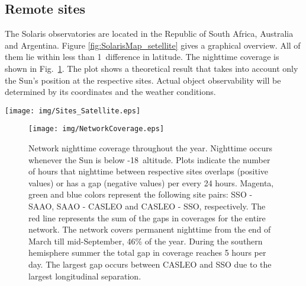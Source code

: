 \subsection{Remote sites}
\label{ssec:RemoteSites}
The Solaris observatories are located in the Republic of South Africa, Australia and Argentina. Figure \ref{fig:SolarisMap_setellite} gives a graphical overview. All of them lie within less than 1\degree\ difference in latitude. The nighttime coverage is shown in Fig.~\ref{fig:NetworkCoverage}. The plot shows a theoretical result that takes into account only the Sun's position at the respective sites. Actual object observability will be determined by its coordinates and the weather conditions.


\begin{figure*}[htb!]
\begin{center}
\texttt{[image: img/Sites\_Satellite.eps]}
\caption{Birdseye views of the three observatories with exact Solaris sites marked along with several important waypoints at the South African Astronomical Observatory (SAAO, South Africa), Siding Spring Observatory (SSO, Australia) and Complejo Astron\'omico El Leoncito (CALSEO, Argentina). North is up on all images.  Background image source google.com.}
\label{fig:SolarisMap_setellite}
\end{center}
\end{figure*}

\begin{figure}[htb!]
\begin{center}
\texttt{[image: img/NetworkCoverage.eps]}
\caption{Network nighttime coverage throughout the year. Nighttime occurs whenever the Sun is below -18\degree ~altitude.  Plots indicate the number of hours that nighttime between respective sites overlaps (positive values) or has a gap (negative values) per every 24 hours. Magenta, green and blue colors represent the following site pairs: SSO - SAAO, SAAO - CASLEO and CASLEO - SSO, respectively. The red line represents the sum of the gaps in coverages for the entire network. The network covers permanent nighttime from the end of March till mid-September, 46\% of the year. During the southern hemisphere summer the total gap in coverage reaches 5 hours per day. The largest gap occurs between CASLEO and SSO due to the largest longitudinal separation.}
\label{fig:NetworkCoverage}
\end{center}
\end{figure}


